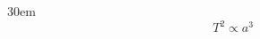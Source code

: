 \documentclass[border=4pt]{standalone}
\begin{document}
\begin{varwidth}{30em}
\large
\[ T^2 \propto a^3 \]

\end{varwidth}
\end{document}
